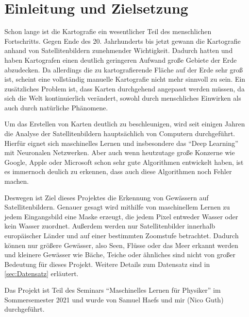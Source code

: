 \section{Einleitung und Zielsetzung}
\label{sec:Einleitung}

Schon lange ist die Kartografie ein wesentlicher Teil des menschlichen Fortschritts.
Gegen Ende des 20. Jahrhunderts bis jetzt gewann die Kartografie anhand von Satellitenbildern zunehmender Wichtigkeit.
Dadurch hatten und haben Kartografen einen deutlich geringeren Aufwand große Gebiete der Erde abzudecken.
Da allerdings die zu kartografierende Fläche auf der Erde sehr groß ist, scheint eine vollständig manuelle Kartografie nicht mehr sinnvoll zu sein.
Ein zusätzliches Problem ist, dass Karten durchgehend angepasst werden müssen, da sich die Welt kontinuierlich verändert, 
sowohl durch menschliches Einwirken als auch durch natürliche Phänomene.

Um das Erstellen von Karten deutlich zu beschleunigen, wird seit einigen Jahren die Analyse der Satellitenbildern hauptsächlich von Computern durchgeführt.
Hierfür eignet sich maschinelles Lernen und insbesondere das \enquote{Deep Learning} mit Neuronalen Netzwerken.
Aber auch wenn heutzutage große Konzerne wie Google, Apple oder Microsoft schon sehr gute Algorithmen entwickelt haben,
ist es immernoch deulich zu erkennen, dass auch diese Algorithmen noch Fehler machen.

Deswegen ist Ziel dieses Projektes die Erkennung von Gewässern auf Satellitenbildern.
Genauer gesagt wird mithilfe von maschinellem Lernen zu jedem Eingangsbild eine Maske erzeugt, die jedem Pixel entweder Wasser oder kein Wasser zuordnet.
Außerdem werden nur Satellitenbilder innerhalb europäischer Länder und auf einer bestimmten Zoomstufe betrachtet.
Dadurch können nur größere Gewässer, also Seen, Flüsse oder das Meer erkannt werden und kleinere Gewässer wie Bäche, Teiche oder ähnliches sind nicht von großer Bedeutung für dieses Projekt.
Weitere Details zum Datensatz sind in \autoref{sec:Datensatz} erläutert.

Das Projekt ist Teil des Seminars \enquote{Maschinelles Lernen für Physiker} im Sommersemester 2021 und wurde von Samuel Haefs und mir (Nico Guth) durchgeführt.
